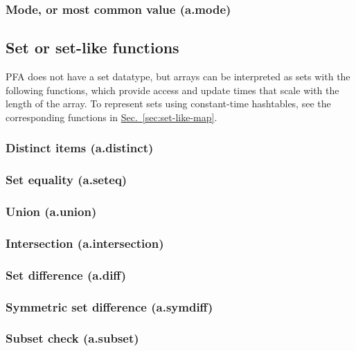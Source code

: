 \documentclass{article}
\theoremstyle{definition}
\begin{document}
\subsubsection{Mode, or most common value (a.mode)}

\hypertarget{hsec:set-like}{}
\subsection{Set or set-like functions}
\label{sec:set-like}

PFA does not have a set datatype, but arrays can be interpreted as sets with the following functions, which provide access and update times that scale with the length of the array.  To represent sets using constant-time hashtables, see the corresponding functions in \hyperlink{hsec:set-like-map}{Sec.~\ref{sec:set-like-map}}.

\subsubsection{Distinct items (a.distinct)}

\subsubsection{Set equality (a.seteq)}

\subsubsection{Union (a.union)}

\subsubsection{Intersection (a.intersection)}

\subsubsection{Set difference (a.diff)}

\subsubsection{Symmetric set difference (a.symdiff)}

\subsubsection{Subset check (a.subset)}
\end{document}
